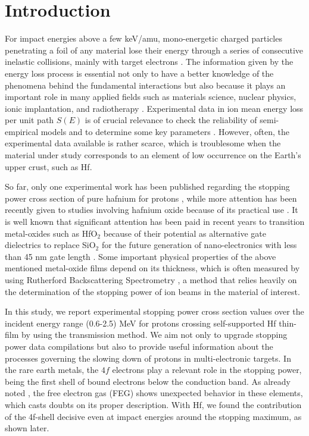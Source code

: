 \documentclass[aps,prb,reprint,groupedaddress]{revtex4-1}
\begin{document}
\section{Introduction}
\label{intro}

For impact energies above a few keV/amu, mono-energetic charged particles penetrating a foil of any material lose their energy through a series of consecutive inelastic collisions, mainly with target electrons \cite{Chu01,Sigmund}. 
The information given by the energy loss process is essential not only to have a better knowledge of the phenomena behind the fundamental interactions but also because it plays an important role in many applied fields such as materials science, nuclear physics, ionic implantation, and radiotherapy \cite{Sigmund,Schardt}. 
Experimental data in ion mean energy loss per unit path $S(E)$ is of crucial relevance to check the reliability of semi-empirical models and to determine some key parameters \cite{Diwan,Damache04,Damache02}. 
However, often, the experimental data available is rather scarce, which is troublesome when the material under study corresponds to an element of low occurrence on the Earth's upper crust, such as Hf.

So far, only one experimental work has been published regarding the stopping power cross section of pure hafnium for protons \cite{Sirotinin}, while more attention has been recently given to studies involving hafnium oxide because of its practical use \cite{Abril,Behar,Primetzhofer}. 
It is well known that significant attention has been paid in recent years to transition metal-oxides such as HfO$_2$ because of their potential as alternative gate dielectrics to replace SiO$_2$ for the future generation of nano-electronics with less than 45 nm gate length \cite{Choi,Robertson}. 
Some important physical properties of the above mentioned metal-oxide films depend on its thickness, which is often measured by using Rutherford Backscattering Spectrometry \cite{Alfassi01, Tesmer01}, a method that relies heavily on the determination of the stopping power of ion beams in the material of interest.

In this study, we report experimental stopping power cross section values over the incident energy range (0.6-2.5) MeV for protons crossing self-supported Hf thin-film by using the transmission method.
We aim not only to upgrade stopping power data compilations \cite{HPaul03,mondim17} but also to provide useful information about the processes governing the slowing down of protons in multi-electronic targets. 
In the rare earth metals, the $4f$ electrons play a relevant role in the stopping power, being the first shell of bound electrons below the conduction band. As already noted \cite{Roth17}, the free electron gas (FEG) shows unexpected behavior in these elements, which casts doubts on its proper description. With Hf, we found the contribution of the 4f-shell decisive even at impact energies around the stopping maximum, as shown later.
\end{document}
